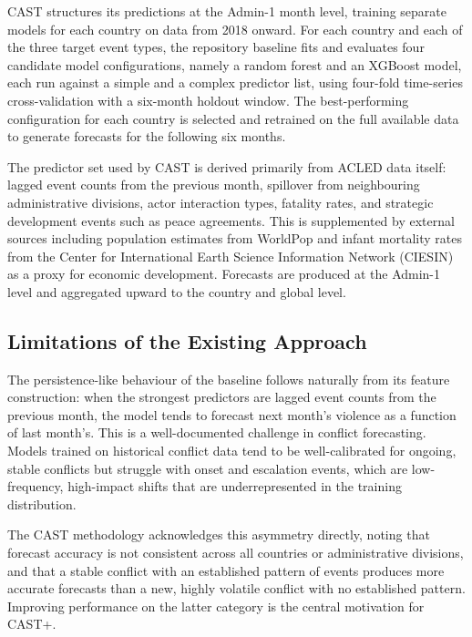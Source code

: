 \documentclass[12pt,a4paper]{article}
\begin{document}

CAST structures its predictions at the Admin-1 month level, training
separate models for each country on data from 2018 onward. For each
country and each of the three target event types, the repository baseline
fits and evaluates four candidate model configurations, namely a random
forest and an XGBoost model, each run against a simple and a complex
predictor list, using four-fold time-series cross-validation with a
six-month holdout window. The best-performing configuration for each
country is selected and retrained on the full available data to generate
forecasts for the following six months.

The predictor set used by CAST is derived primarily from ACLED data
itself: lagged event counts from the previous month, spillover from
neighbouring administrative divisions, actor interaction types, fatality
rates, and strategic development events such as peace agreements. This is
supplemented by external sources including population estimates from
WorldPop and infant mortality rates from the Center for International
Earth Science Information Network (CIESIN) as a proxy for economic
development. Forecasts are produced at the Admin-1 level and aggregated
upward to the country and global level.

\subsection{Limitations of the Existing Approach}

The persistence-like behaviour of the baseline follows naturally from its
feature construction: when the strongest predictors are lagged event
counts from the previous month, the model tends to forecast next month's
violence as a function of last month's. This is a well-documented
challenge in conflict forecasting. Models trained on historical conflict
data tend to be well-calibrated for ongoing, stable conflicts but
struggle with onset and escalation events, which are low-frequency,
high-impact shifts that are underrepresented in the training distribution.

The CAST methodology acknowledges this asymmetry directly, noting that
forecast accuracy is not consistent across all countries or administrative
divisions, and that a stable conflict with an established pattern of
events produces more accurate forecasts than a new, highly volatile
conflict with no established pattern. Improving performance on the latter
category is the central motivation for CAST+.
\end{document}
